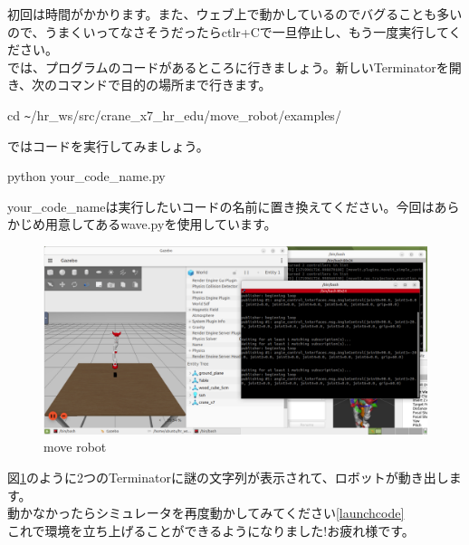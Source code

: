 \documentclass[a4paper,10pt]{jsarticle}
\begin{document}
初回は時間がかかります。また、ウェブ上で動かしているのでバグることも多いので、うまくいってなさそうだったらctlr+Cで一旦停止し、もう一度実行してください。\\
では、プログラムのコードがあるところに行きましょう。新しいTerminatorを開き、次のコマンドで目的の場所まで行きます。
\begin{center}
  cd \verb|~|/hr\_ws/src/crane\_x7\_hr\_edu/move\_robot/examples/
\end{center}
ではコードを実行してみましょう。
\begin{center}
  python your\_code\_name.py
\end{center}
your\_code\_nameは実行したいコードの名前に置き換えてください。今回はあらかじめ用意してあるwave.pyを使用しています。
\begin{figure}[ht]
  \begin{center}
    \includegraphics[width=12cm]{pictures/wave.png}
    \caption{move robot}
    \label{moverobot}
  \end{center}
\end{figure}
図\ref{moverobot}のように2つのTerminatorに謎の文字列が表示されて、ロボットが動き出します。\\
動かなかったらシミュレータを再度動かしてみてください\ref{launchcode}\\
これで環境を立ち上げることができるようになりました!お疲れ様です。
\end{document}

